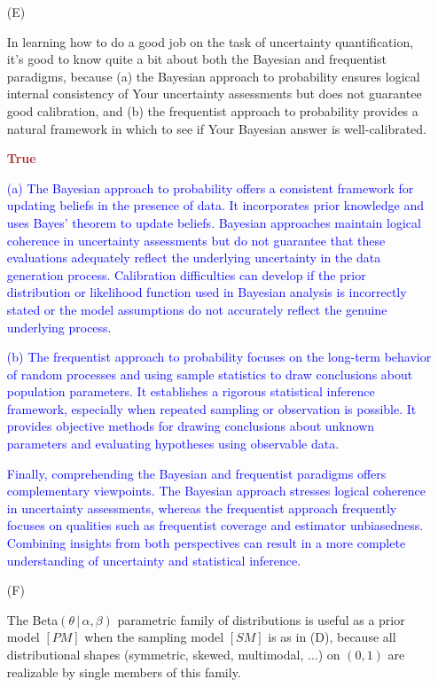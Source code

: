 \documentclass[12pt]{article}
\newcommand{\given}{\, | \,}
\begin{document}
\begin{itemize}
\item[(E)]

In learning how to do a good job on the task of uncertainty quantification,
it's good to know quite a bit about both the Bayesian and frequentist
paradigms, because (a) the Bayesian approach to probability ensures logical
internal consistency of Your uncertainty assessments but does not guarantee
good calibration, and (b) the frequentist approach to probability provides
a natural framework in which to see if Your Bayesian answer is
well-calibrated.

\textcolor{brown}{\textbf{True}}

\textcolor{blue}{(a) The Bayesian approach to probability offers a consistent framework for updating beliefs in the presence of data. It incorporates prior knowledge and uses Bayes' theorem to update beliefs. Bayesian approaches maintain logical coherence in uncertainty assessments but do not guarantee that these evaluations adequately reflect the underlying uncertainty in the data generation process. Calibration difficulties can develop if the prior distribution or likelihood function used in Bayesian analysis is incorrectly stated or the model assumptions do not accurately reflect the genuine underlying process.}

\textcolor{blue}{(b) The frequentist approach to probability focuses on the long-term behavior of random processes and using sample statistics to draw conclusions about population parameters. It establishes a rigorous statistical inference framework, especially when repeated sampling or observation is possible. It provides objective methods for drawing conclusions about unknown parameters and evaluating hypotheses using observable data.}

\textcolor{blue}{Finally, comprehending the Bayesian and frequentist paradigms offers complementary viewpoints. The Bayesian approach stresses logical coherence in uncertainty assessments, whereas the frequentist approach frequently focuses on qualities such as frequentist coverage and estimator unbiasedness. Combining insights from both perspectives can result in a more complete understanding of uncertainty and statistical inference.}




\item[(F)]

The Beta$( \theta \given \alpha, \beta )$ parametric family of distributions is
useful as a prior model $[ PM ]$ when the sampling model $[ SM ]$ is as in
(D), because all distributional shapes (symmetric, skewed, multimodal, ...)
on $( 0, 1 )$ are realizable by single members of this family.


\end{itemize}
\end{document}
